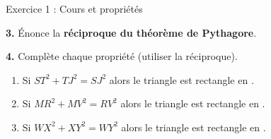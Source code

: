 \begin{exercisebox}{ Exercice 1 : Cours et propriétés }
  \smallspace

  \textbf{3.} Énonce la \textbf{réciproque du théorème de Pythagore}. 


  \smallspace

  \textbf{4.} Complète chaque propriété (utiliser la réciproque). 
  \begin{enumerate}[label=\alph*)]
    \item Si $ST^2 + TJ^2 = SJ^2$ alors le triangle \onlyeleve{\underline{\hspace{1.6cm}}}  est rectangle en \onlyeleve{\underline{\hspace{1cm}}} .
    \item Si $MR^2 + MV^2 = RV^2$ alors le triangle \onlyeleve{\underline{\hspace{1.6cm}}}  est rectangle en \onlyeleve{\underline{\hspace{1cm}}} .
    \item Si $WX^2 + XY^2 = WY^2$ alors le triangle \onlyeleve{\underline{\hspace{1.6cm}}}  est rectangle en \onlyeleve{\underline{\hspace{1cm}}} .
  \end{enumerate}
\end{exercisebox}

\exspace

